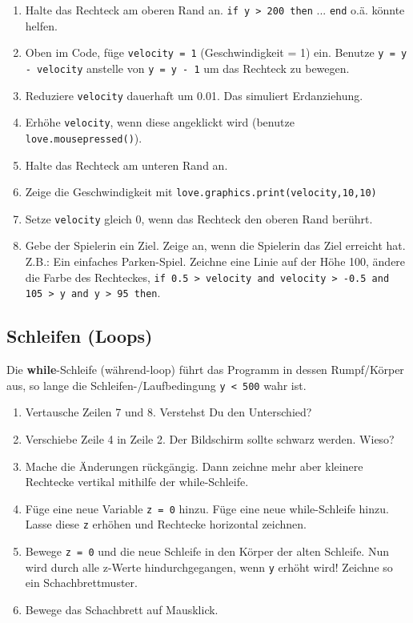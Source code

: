\documentclass[a4paper, 11pt]{article}
\begin{document}
\begin{enumerate} 
\item Halte das Rechteck am oberen Rand an. \texttt{if y > 200 then} ... \texttt{end} o.ä. könnte helfen.
\item Oben im Code, füge \texttt{velocity = 1} (Geschwindigkeit = 1) ein. Benutze \texttt{y = y - velocity} anstelle von \texttt{y = y - 1} um das Rechteck zu bewegen.
\item Reduziere \texttt{velocity} dauerhaft um 0.01. Das simuliert Erdanziehung.
\item Erhöhe \texttt{velocity}, wenn diese angeklickt wird (benutze \texttt{love.mousepressed()}).
\item Halte das Rechteck am unteren Rand an.
\item Zeige die Geschwindigkeit mit \texttt{love.graphics.print(velocity,10,10)}
\item Setze \texttt{velocity} gleich 0, wenn das Rechteck den oberen Rand berührt.
\item Gebe der Spielerin ein Ziel. Zeige an, wenn die Spielerin das Ziel erreicht hat. Z.B.: Ein einfaches Parken-Spiel. Zeichne eine Linie auf der Höhe 100, ändere die Farbe des Rechteckes, \texttt{if 0.5 > velocity and velocity > -0.5 and 105 > y and y > 95 then}.
\end{enumerate}

\subsection{Schleifen (Loops)}

Die \textbf{while}-Schleife (während-loop) führt das Programm in dessen Rumpf/Körper aus, so lange die Schleifen-/Laufbedingung \texttt{y < 500} wahr ist.



\begin{enumerate}
\item Vertausche Zeilen 7 und 8. Verstehst Du den Unterschied?
\item Verschiebe Zeile 4 in Zeile 2. Der Bildschirm sollte schwarz werden. Wieso?
\item Mache die Änderungen rückgängig. Dann zeichne mehr aber kleinere Rechtecke vertikal mithilfe der while-Schleife.
\item Füge eine neue Variable \texttt{z = 0} hinzu. Füge eine neue while-Schleife hinzu. Lasse diese \texttt{z} erhöhen und Rechtecke horizontal zeichnen.
\item Bewege \texttt{z = 0} und die neue Schleife in den Körper der alten Schleife. Nun wird durch alle z-Werte hindurchgegangen, wenn \texttt{y} erhöht wird! Zeichne so ein Schachbrettmuster.
\item Bewege das Schachbrett auf Mausklick.
\end{enumerate}
\end{document}
